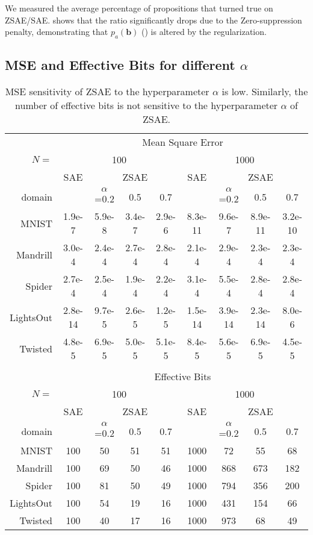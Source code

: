 \documentclass[10pt,letterpaper]{article}
\begin{document}
We measured the average percentage of propositions that turned true on ZSAE/SAE.
 shows that the ratio significantly drops due to the Zero-suppression penalty,
demonstrating that $p_a(\mathbf{b})$ () is altered by the regularization.

\subsection{MSE and Effective Bits for different $\alpha$}
\label{more-sensitivity}

\begin{table}[htbp]
 \centering
 \setlength{\tabcolsep}{0.25em}
 \begin{tabular}{|r|*{8}{c|}}
     & \multicolumn{8}{c|}{Mean Square Error} \\
$N=$ & \multicolumn{4}{c|}{100} & \multicolumn{4}{c|}{1000} \\
     & SAE & \multicolumn{3}{c|}{ZSAE} & SAE & \multicolumn{3}{c|}{ZSAE} \\
domain    &   & $\alpha$=0.2 & 0.5  & 0.7 &   & $\alpha$=0.2 & 0.5  & 0.7 \\ 
MNIST     & 1.9e-7  &5.9e-8 & 3.4e-7 & 2.9e-6 &8.3e-11 &9.6e-7  & 8.9e-11 &3.2e-10 \\ 
Mandrill  & 3.0e-4  &2.4e-4 & 2.7e-4 & 2.8e-4 &2.1e-4  &2.9e-4  & 2.3e-4  &2.3e-4  \\ 
Spider    & 2.7e-4  &2.5e-4 & 1.9e-4 & 2.2e-4 &3.1e-4  &5.5e-4  & 2.8e-4  &2.8e-4  \\ 
LightsOut & 2.8e-14 &9.7e-5 & 2.6e-5 & 1.2e-5 &1.5e-14 &3.9e-14 & 2.3e-14 &8.0e-6  \\ 
Twisted   & 4.8e-5  &6.9e-5 & 5.0e-5 & 5.1e-5 &8.4e-5  &5.6e-5  & 6.9e-5  &4.5e-5  \\
\multicolumn{9}{c}{}\\
     & \multicolumn{8}{c|}{Effective Bits} \\
$N=$ & \multicolumn{4}{c|}{100} & \multicolumn{4}{c|}{1000} \\
     & SAE & \multicolumn{3}{c|}{ZSAE} & SAE & \multicolumn{3}{c|}{ZSAE} \\
domain    &   & $\alpha$=0.2 & 0.5  & 0.7 &   & $\alpha$=0.2 & 0.5  & 0.7 \\ 
MNIST     & 100 & 50 & 51 & 51 & 1000 & 72  & 55  & 68 \\ 
Mandrill  & 100 & 69 & 50 & 46 & 1000 & 868 & 673 & 182 \\ 
Spider    & 100 & 81 & 50 & 49 & 1000 & 794 & 356 & 200 \\ 
LightsOut & 100 & 54 & 19 & 16 & 1000 & 431 & 154 & 66 \\ 
Twisted   & 100 & 40 & 17 & 16 & 1000 & 973 & 68  & 49 \\ 
\end{tabular}
 \caption{
MSE sensitivity of ZSAE to the hyperparameter $\alpha$ is low.
Similarly,
the number of effective bits is not sensitive to the hyperparameter $\alpha$ of ZSAE.
}
\label{tab:more-sensitivity}
\end{table}
\end{document}
